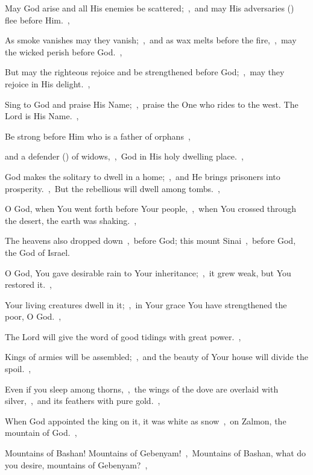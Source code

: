 \documentclass[12pt,twoside,a5paper]{article}
\begin{document}
\begin{normalparskip}
  May God arise and all His enemies be scattered;~\sep\ and may His adversaries () flee before Him.~\sep


  As smoke vanishes may they vanish;~\sep\ and as wax melts before the fire,~\sep\ may the wicked perish before God.~\sep

  But may the righteous rejoice and be strengthened before God;~\sep\ may they rejoice in His delight.~\sep

  Sing to God and praise His Name;~\sep\ praise the One who rides to the west. The Lord is His Name.~\sep

  Be strong before Him who is a father of orphans~\sep

  and a defender () of widows,~\sep\ God in His holy dwelling place.~\sep

  God makes the solitary to dwell in a home;~\sep\ and He brings prisoners into prosperity.~\sep\ But the rebellious will dwell among tombs.~\sep

  O God, when You went forth before Your people,~\sep\ when You crossed through the desert, the earth was shaking.~\sep

  The heavens also dropped down~\sep\ before God; this mount Sinai~\sep\ before God, the God of Israel.

  O God, You gave desirable rain to Your inheritance;~\sep\ it grew weak, but You restored it.~\sep

  Your living creatures dwell in it;~\sep\ in Your grace You have strengthened the poor, O God.~\sep

  The Lord will give the word of good tidings with great power.~\sep

  Kings of armies will be assembled;~\sep\ and the beauty of Your house will divide the spoil.~\sep

  Even if you sleep among thorns,~\sep\ the wings of the dove are overlaid with silver,~\sep\ and its feathers with pure gold.~\sep

  When God appointed the king on it, it was white as snow~\sep\ on Zalmon, the mountain of God.~\sep

  Mountains of Bashan! Mountains of Gebenyam!~\sep\ Mountains of Bashan, what do you desire, mountains of Gebenyam?~\sep


\end{normalparskip}
\end{document}
